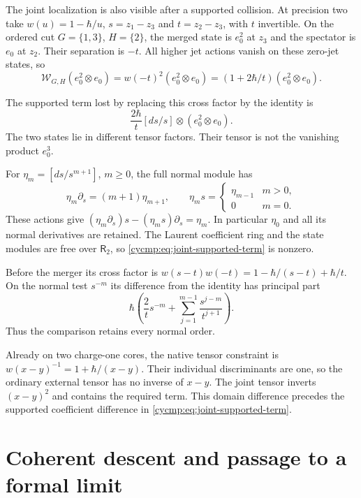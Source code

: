 \begin{example}\label{cycmp:ex:joint-support}
The joint localization is also visible after a supported collision.
At precision two take $w(u)=1-\hbar/u$, $s=z_1-z_3$ and
$t=z_2-z_3$, with $t$ invertible. On the ordered cut
$G=\{1,3\}$, $H=\{2\}$, the merged state is $e_0^2$ at $z_3$
and the spectator is $e_0$ at $z_2$. Their separation is $-t$.
All higher jet actions vanish on these zero-jet states, so
\[
 \mathcal W_{G,H}(e_0^2\otimes e_0)
       =w(-t)^2(e_0^2\otimes e_0)
       =(1+2\hbar/t)(e_0^2\otimes e_0).
\]

The supported term lost by replacing this cross factor by the
identity is
\begin{equation}\label{cycmp:eq:joint-supported-term}
 \frac{2\hbar}{t}[ds/s]\otimes(e_0^2\otimes e_0).
\end{equation}
The two states lie in different tensor factors. Their tensor is
not the vanishing product $e_0^3$.

For $\eta_m=[ds/s^{m+1}]$, $m\ge0$, the full normal module has
\[
 \eta_m\partial_s=(m+1)\eta_{m+1},\qquad
 \eta_m s=\begin{cases}\eta_{m-1}&m>0,\\0&m=0.\end{cases}
\]
These actions give
$(\eta_m\partial_s)s-(\eta_ms)\partial_s=\eta_m$.
In particular $\eta_0$ and all its normal derivatives are retained.
The Laurent coefficient ring and the state modules are free over
$\mathsf R_2$, so \eqref{cycmp:eq:joint-supported-term} is nonzero.

Before the merger its cross factor is
$w(s-t)w(-t)=1-\hbar/(s-t)+\hbar/t$. On the normal test $s^{-m}$
its difference from the identity has principal part
\[
 \hbar\left(\frac{2}{t}s^{-m}
       +\sum_{j=1}^{m-1}\frac{s^{j-m}}{t^{j+1}}\right).
\]
Thus the comparison retains every normal order.

Already on two charge-one cores, the native tensor constraint is
$w(x-y)^{-1}=1+\hbar/(x-y)$. Their individual discriminants are
one, so the ordinary external tensor has no inverse of $x-y$.
The joint tensor inverts $(x-y)^2$ and contains the required term.
This domain difference precedes the supported coefficient difference
in \eqref{cycmp:eq:joint-supported-term}.
\end{example}

\section{Coherent descent and passage to a formal limit}
\label{cycmp:sec:descent}

